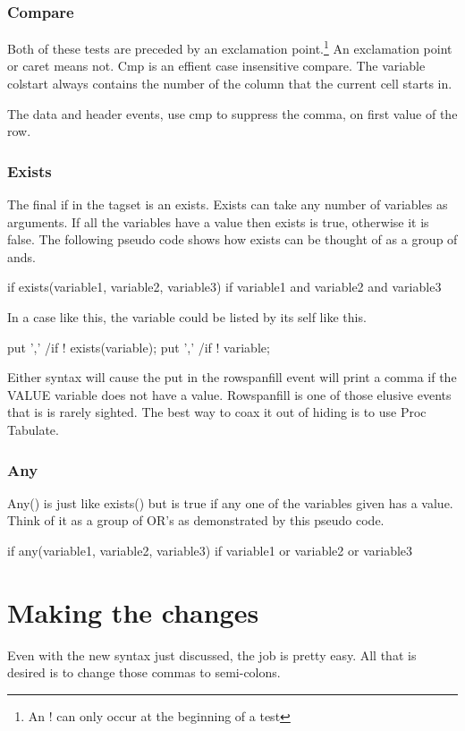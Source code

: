 \subsubsection{Compare}
Both of these tests are preceded
by an exclamation point.\footnote{An ! can only occur
at the beginning of a test}  An exclamation point or
caret means not.  Cmp is an effient case insensitive
compare.  The variable colstart always contains the 
number of the column that the current cell starts in.

The data and header events, use cmp to suppress the comma,
on first value of the row.

\subsubsection{Exists}
The final if in the tagset is an exists.  Exists can take any number
of variables as arguments.  If all the variables have
a value then exists is true, otherwise it is false.
The following pseudo code shows how exists can be thought 
of as a group of ands. 
\begin{sfvcode}
  if exists(variable1, variable2, variable3)
  if variable1 and variable2 and variable3
\end{sfvcode}
In a case like this, the variable could be listed
by its self like this.
\begin{sfvcode}
  put ',' /if ! exists(variable);
  put ',' /if ! variable;
\end{sfvcode}
Either syntax will cause 
the put in the rowspanfill event will print a comma
if the VALUE variable does not have a value.  Rowspanfill is one of those
elusive events that is is rarely sighted.  The best way to coax it out of
hiding is to use Proc Tabulate.

\subsubsection{Any}
Any() is just like exists() but is true if any one
of the variables given has a value.  Think of it as
a group of OR's as demonstrated by this pseudo code.
\begin{sfvcode}
   if any(variable1, variable2, variable3)
   if variable1 or variable2 or variable3
\end{sfvcode}

\section{Making the changes}
Even with the new syntax just discussed, the job is pretty easy.  All that
is desired is to change those commas to semi-colons.

